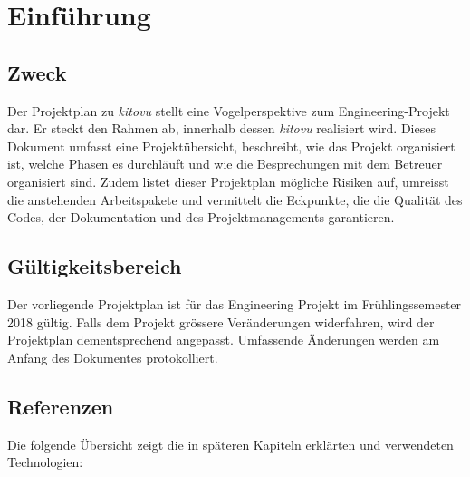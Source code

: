 \documentclass[a4paper]{article}
\let\oldsection\section
\renewcommand\section{\clearpage\oldsection}
\begin{document}
\section{Einführung}
\subsection{Zweck}
Der Projektplan zu \emph{kitovu} stellt eine Vogelperspektive zum Engineering-Projekt dar. Er steckt den Rahmen ab, innerhalb dessen \emph{kitovu} realisiert wird. Dieses Dokument umfasst eine Projektübersicht, beschreibt, wie das Projekt organisiert ist, welche Phasen es durchläuft und wie die Besprechungen mit dem Betreuer organisiert sind. Zudem listet dieser Projektplan mögliche Risiken auf, umreisst die anstehenden Arbeitspakete und vermittelt die Eckpunkte, die die Qualität des Codes, der Dokumentation und des Projektmanagements garantieren.

\subsection{Gültigkeitsbereich}
Der vorliegende Projektplan ist für das Engineering Projekt im Frühlingssemester 2018 gültig. Falls dem Projekt grössere Veränderungen widerfahren, wird der Projektplan dementsprechend angepasst. Umfassende Änderungen werden am Anfang des Dokumentes protokolliert.

\subsection{Referenzen}


Die folgende Übersicht zeigt die in späteren Kapiteln erklärten und verwendeten Technologien:
\end{document}
